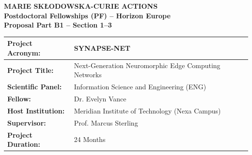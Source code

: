 \documentclass[11pt,a4paper]{article}
\begin{document}
\noindent
\begin{tcolorbox}[
  colback=white,
  colframe=MSCABlue,
  arc=3mm,
  boxrule=1.5pt,
  top=4mm, bottom=4mm, left=4mm, right=4mm
]
\begin{minipage}[c]{0.72\textwidth}
  {\fontsize{16}{20}\selectfont\bfseries\color{MSCABlue} MARIE SK{\L}ODOWSKA-CURIE ACTIONS} \\[1mm]
  {\fontsize{12}{14}\selectfont\bfseries\color{MSCAGold} Postdoctoral Fellowships (PF) -- Horizon Europe} \\[2mm]
  {\fontsize{10}{12}\selectfont\color{MSCADarkGray}\textbf{Proposal Part B1 -- Section 1--3}}
\end{minipage}\hfill
\begin{minipage}[c]{0.24\textwidth}
  \centering
\end{minipage}
\end{tcolorbox}

\vspace{0.3cm}

\noindent
\begin{tcolorbox}[
  colback=white,
  colframe=MSCABorder,
  arc=2mm,
  boxrule=1pt,
  top=3mm, bottom=3mm, left=4mm, right=4mm
]
\begin{tabularx}{\textwidth}{lX}
  \textbf{Project Acronym:} & SYNAPSE-NET \\ \midrule
  \textbf{Project Title:} & Next-Generation Neuromorphic Edge Computing Networks \\ \midrule
  \textbf{Scientific Panel:} & Information Science and Engineering (ENG) \\ \midrule
  \textbf{Fellow:} & Dr. Evelyn Vance \\ \midrule
  \textbf{Host Institution:} & Meridian Institute of Technology (Nexa Campus) \\ \midrule
  \textbf{Supervisor:} & Prof. Marcus Sterling \\ \midrule
  \textbf{Project Duration:} & 24 Months
\end{tabularx}
\end{tcolorbox}

\vspace{0.4cm}
\end{document}
